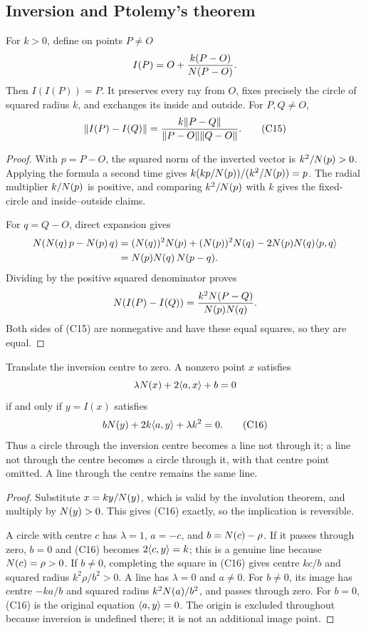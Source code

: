 \subsection{Inversion and Ptolemy's theorem}

\begin{theorem}
\label{circ:inversion}
For $k>0$, define on points $P\ne O$
\[
 I(P)=O+\frac{k(P-O)}{N(P-O)}.
\]
Then $I(I(P))=P$.  It preserves every ray from $O$, fixes precisely the
circle of squared radius $k$, and exchanges its inside and outside.
For $P,Q\ne O$,
\[
 \lVert I(P)-I(Q)\rVert
   =\frac{k\lVert P-Q\rVert}{\lVert P-O\rVert\lVert Q-O\rVert}.            \tag{C15}
\]
\end{theorem}
\begin{proof}
With $p=P-O$, the squared norm of the inverted vector is
$k^2/N(p)>0$.  Applying the formula a second time gives
$k(kp/N(p))/(k^2/N(p))=p$.
The radial multiplier $k/N(p)$ is positive, and comparing
$k^2/N(p)$ with $k$ gives the fixed-circle and inside--outside
claims.

For $q=Q-O$, direct expansion gives
\begin{align*}
 N(N(q)\,p-N(p)\,q)
  &=(N(q))^2N(p)+(N(p))^2N(q)
       -2N(p)N(q)\langle p,q\rangle\\
  &=N(p)N(q)\,N(p-q).
\end{align*}
Dividing by the positive squared denominator proves
\[
 N(I(P)-I(Q))
      =\frac{k^2N(P-Q)}{N(p)N(q)}.
\]
Both sides of (C15) are nonnegative and have these equal squares, so they
are equal.
\end{proof}

\begin{theorem}
\label{circ:inversion-circle}
Translate the inversion centre to zero.  A nonzero point $x$ satisfies
\[
 \lambda N(x)+2\langle a,x\rangle+b=0
\]
if and only if $y=I(x)$ satisfies
\[
 bN(y)+2k\langle a,y\rangle+\lambda k^2=0.              \tag{C16}
\]
Thus a circle through the inversion centre becomes a line not through it;
a line not through the centre becomes a circle through it, with that
centre point omitted.  A line through the centre remains the same line.
\end{theorem}
\begin{proof}
Substitute $x=ky/N(y)$, which is valid by the involution theorem,
and multiply by $N(y)>0$.  This gives (C16) exactly, so the
implication is reversible.

A circle with centre $c$ has $\lambda=1$, $a=-c$, and
$b=N(c)-\rho$.  If it passes through zero, $b=0$ and (C16) becomes
$2\langle c,y\rangle=k$; this is a genuine line because $N(c)=\rho>0$.
If $b\ne0$, completing the square in (C16) gives centre $kc/b$ and
squared radius $k^2\rho/b^2>0$.
A line has $\lambda=0$ and $a\ne0$.  For $b\ne0$, its image has centre
$-ka/b$ and squared radius $k^2N(a)/b^2$, and passes through zero.
For $b=0$, (C16) is the original equation $\langle a,y\rangle=0$.
The origin is excluded throughout because inversion is undefined there;
it is not an additional image point.
\end{proof}

